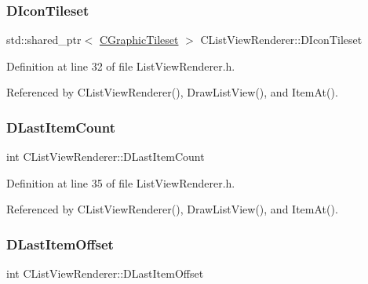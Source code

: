 \subsubsection{\texorpdfstring{D\+Icon\+Tileset}{DIconTileset}}
{\footnotesize\ttfamily std\+::shared\+\_\+ptr$<$ \hyperlink{classCGraphicTileset}{C\+Graphic\+Tileset} $>$ C\+List\+View\+Renderer\+::\+D\+Icon\+Tileset\hspace{0.3cm}{\ttfamily [protected]}}



Definition at line 32 of file List\+View\+Renderer.\+h.



Referenced by C\+List\+View\+Renderer(), Draw\+List\+View(), and Item\+At().

\hypertarget{classCListViewRenderer_a087155c29c7ac3a830f6645af590ed94}{}\label{classCListViewRenderer_a087155c29c7ac3a830f6645af590ed94} 
\subsubsection{\texorpdfstring{D\+Last\+Item\+Count}{DLastItemCount}}
{\footnotesize\ttfamily int C\+List\+View\+Renderer\+::\+D\+Last\+Item\+Count\hspace{0.3cm}{\ttfamily [protected]}}



Definition at line 35 of file List\+View\+Renderer.\+h.



Referenced by C\+List\+View\+Renderer(), Draw\+List\+View(), and Item\+At().

\hypertarget{classCListViewRenderer_ad6b2b0052b8f74e3198fbfb39900b4e3}{}\label{classCListViewRenderer_ad6b2b0052b8f74e3198fbfb39900b4e3} 
\subsubsection{\texorpdfstring{D\+Last\+Item\+Offset}{DLastItemOffset}}
{\footnotesize\ttfamily int C\+List\+View\+Renderer\+::\+D\+Last\+Item\+Offset\hspace{0.3cm}{\ttfamily [protected]}}



